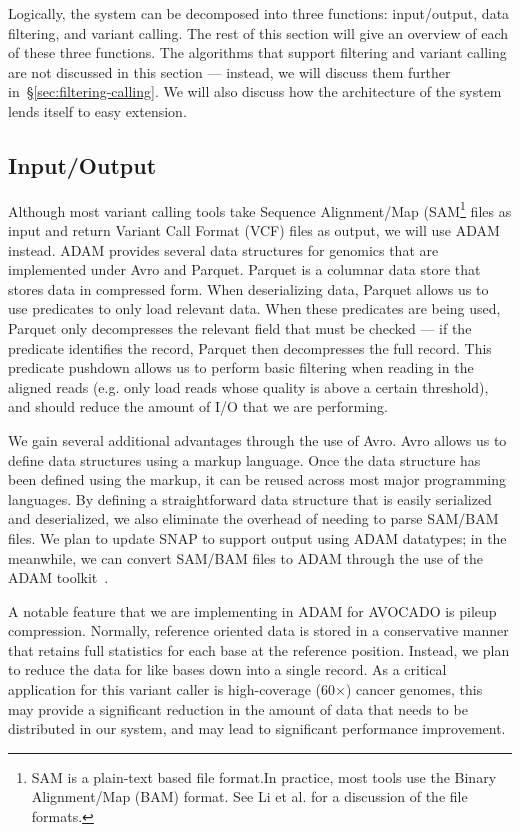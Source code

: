 \documentclass[11pt]{article}
\begin{document}
Logically, the system can be decomposed into three functions: input/out\-put, data filtering, and variant calling. The rest of this
section will give an overview of each of these three functions. The algorithms that support filtering and variant calling are not
discussed in this section --- instead, we will discuss them further in~\S\ref{sec:filtering-calling}. We will also discuss how the
architecture of the system lends itself to easy extension.

\subsection{Input/Output}
\label{sec:io}

Although most variant calling tools take Sequence Alignment/Map (SAM\footnote{SAM is a plain-text based file format.In
practice, most tools use the Binary Alignment/Map (BAM) format. See Li et al.\cite{li09} for a discussion of the file formats.} files
as input and return Variant Call Format (VCF) files as output, we will use ADAM instead. ADAM provides several data structures for
genomics that are implemented under Avro and Parquet. Parquet is a columnar data store that stores data in compressed form.
When deserializing data, Parquet allows us to use predicates to only load relevant data. When these predicates are being used,
Parquet only decompresses the relevant field that must be checked --- if the predicate identifies the record, Parquet then
decompresses the full record. This predicate pushdown allows us to perform basic filtering when reading in the aligned
reads (e.g. only load reads whose quality is above a certain threshold), and should reduce the amount of I/O that we are performing.

We gain several additional advantages through the use of Avro. Avro allows us to define data structures using a markup
language. Once the data structure has been defined using the markup, it can be reused across most major programming
languages. By defining a straightforward data structure that is easily serialized and deserialized, we also eliminate the overhead
of needing to parse SAM/BAM files. We plan to update SNAP to support output using ADAM datatypes; in the meanwhile,
we can convert SAM/BAM files to ADAM through the use of the ADAM toolkit~\cite{adam}.

A notable feature that we are implementing in ADAM for AVOCADO is pileup compression. Normally, reference oriented data is
stored in a conservative manner that retains full statistics for each base at the reference position. Instead, we plan to reduce the
data for like bases down into a single record. As a critical application for this variant caller is high-coverage (60$\times$) cancer
genomes, this may provide a significant reduction in the amount of data that needs to be distributed in our system, and may lead
to significant performance improvement.
\end{document}
